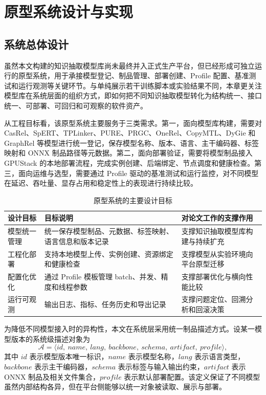 \chapter{原型系统设计与实现}

\section{系统总体设计}
虽然本文构建的知识抽取模型库尚未最终并入正式生产平台，但已经形成可独立运行的原型系统，用于承接模型登记、制品管理、部署创建、Profile 配置、基准测试和运行观测等关键环节。与单纯展示若干训练脚本或实验结果不同，本章更关注模型库在系统层面的组织方式，即如何把不同知识抽取模型转化为结构统一、接口统一、可部署、可回归和可观察的软件资产。

从工程目标看，该原型系统主要服务于三类需求。第一，面向模型库构建，需要对 CasRel、SpERT、TPLinker、PURE、PRGC、OneRel、CopyMTL、DyGie 和 GraphRel 等模型进行统一登记，保存模型名称、版本、语言、主干编码器、标签映射和 ONNX 制品路径等元数据。第二，面向部署验证，需要将模型制品接入 GPUStack 的本地部署流程，完成实例创建、后端绑定、节点调度和健康检查。第三，面向运维与选型，需要通过 Profile 驱动的基准测试和运行监控，对不同模型在延迟、吞吐量、显存占用和稳定性上的表现进行持续比较。

\begin{table}[htbp]
  \centering
  \caption{原型系统的主要设计目标}
  \vspace{0.5em}\wuhao
  \begin{tabularx}{\textwidth}{l X X}
    \toprule
    设计目标 & 目标说明 & 对论文工作的支撑作用 \\
    \midrule
    模型统一管理 & 统一保存模型制品、元数据、标签映射、语言信息和版本记录 & 支撑知识抽取模型库构建与持续扩充 \\
    工程化部署 & 支持本地模型上传、实例创建、资源绑定和健康检查 & 支撑模型从实验环境向平台原型迁移 \\
    配置化优化 & 通过 Profile 模板管理 batch、并发、精度和线程参数 & 支撑部署优化与横向性能比较 \\
    运行可观测 & 输出日志、指标、任务历史和导出记录 & 支撑问题定位、回溯分析和回滚决策 \\
    \bottomrule
  \end{tabularx}
  \label{tab:system_targets_compact}
\end{table}

为降低不同模型接入时的异构性，本文在系统层采用统一制品描述方式。设某一模型版本的系统级描述对象为
\begin{equation}
\mathcal{A}=\langle id,\ name,\ lang,\ backbone,\ schema,\ artifact,\ profile \rangle ,
\label{eq:artifact_object_system}
\end{equation}
其中 $id$ 表示模型版本唯一标识，$name$ 表示模型名称，$lang$ 表示语言类型，$backbone$ 表示主干编码器，$schema$ 表示标签与输入输出约束，$artifact$ 表示 ONNX 制品及相关文件集合，$profile$ 表示默认部署配置。该定义保证了不同模型虽然内部结构各异，但在平台侧能够以统一对象被读取、展示与部署。

